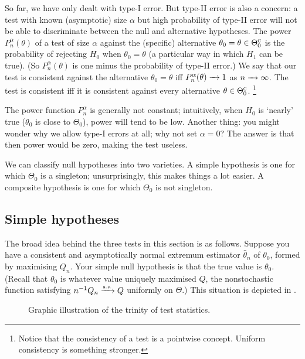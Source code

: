 \documentclass[11pt,letterpaper,reqno,oneside]{article}
\begin{document}
So far, we have only dealt with type-I error. But type-II error is also a concern: a test with known (asymptotic) size $\alpha$ but high probability of type-II error will not be able to discriminate between the null and alternative hypotheses. The power $P_n^\alpha(\theta)$ of a test of size $\alpha$ against the (specific) alternative $\theta_0 = \theta \in \Theta_0^{\textsc{c}}$ is the probability of rejecting $H_0$ when $\theta_0=\theta$ (a particular way in which $H_1$ can be true). (So $P_n^\alpha(\theta)$ is one minus the probability of type-II error.) We say that our test is consistent against the alternative $\theta_0=\theta$ iff $P_n^\alpha(\theta) \xrightarrow{\;\;\;} 1$ as $n\xrightarrow{\;\;\;}\infty$. The test is consistent iff it is consistent against every alternative $\theta \in \Theta_0^{\textsc{c}}$.%
	\footnote{Notice that the consistency of a test is a pointwise concept. Uniform consistency is something stronger.}

The power function $P_n^\alpha$ is generally not constant; intuitively, when $H_0$ is `nearly' true ($\theta_0$ is close to $\Theta_0$), power will tend to be low. Another thing: you might wonder why we allow type-I errors at all; why not set $\alpha=0$? The answer is that then power would be zero, making the test useless.

We can classify null hypotheses into two varieties. A simple hypothesis is one for which $\Theta_0$ is a singleton; unsurprisingly, this makes things a lot easier. A composite hypothesis is one for which $\Theta_0$ is not singleton.



\subsection{Simple hypotheses}
\label{sec:hypothesis_testing:simple}

The broad idea behind the three tests in this section is as follows. Suppose you have a consistent and asymptotically normal extremum estimator $\widehat{\theta}_n$ of $\theta_0$, formed by maximising $Q_n$. Your simple null hypothesis is that the true value is $\theta_0$. (Recall that $\theta_0$ is whatever value uniquely maximised $Q$, the nonstochastic function satisfying $n^{-1} Q_n \xrightarrow{{\scriptscriptstyle \mathrm{a.s.}}} Q$ uniformly on $\Theta$.) This situation is depicted in .
%
\begin{figure}
	\centering
	
	\caption{Graphic illustration of the trinity of test statistics.}
	\label{fig:trinity}
\end{figure}
\end{document}
